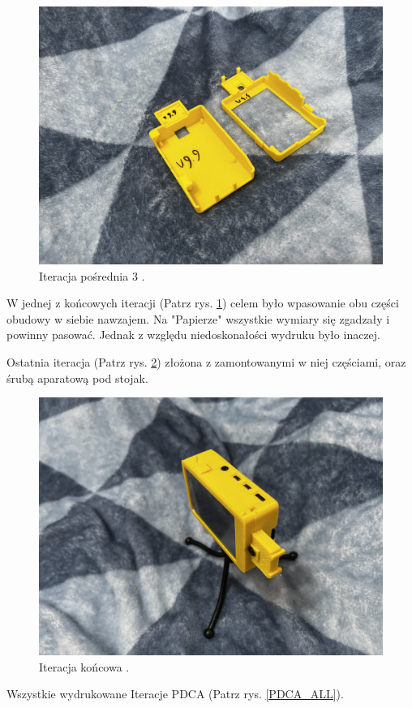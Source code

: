 \documentclass[a4paper,12pt,reqno]{article}
\begin{document}
\begin{figure}[H]%
\centering
\includegraphics[width=0.8\columnwidth]{imgs/print_3.jpg}
\caption{Iteracja pośrednia 3 \cite{img_me}. \label{PDCA_03}}
\quad
\end{figure}

W jednej z końcowych iteracji (Patrz rys. \ref{PDCA_03}) celem było wpasowanie obu części obudowy w siebie nawzajem. Na "Papierze" wszystkie wymiary się zgadzały i powinny pasować. Jednak z względu niedoskonałości wydruku było inaczej.

\newpage
Ostatnia iteracja (Patrz rys. \ref{PDCA_END}) złożona z zamontowanymi w niej częściami, oraz śrubą aparatową pod stojak.
\begin{figure}[H]%
\centering
\includegraphics[width=0.8\columnwidth]{imgs/print_last_assembled.jpg}
\caption{Iteracja końcowa \cite{img_me}. \label{PDCA_END}}
\quad
\end{figure}

Wszystkie wydrukowane Iteracje PDCA (Patrz rys. \ref{PDCA_ALL}).
\end{document}

